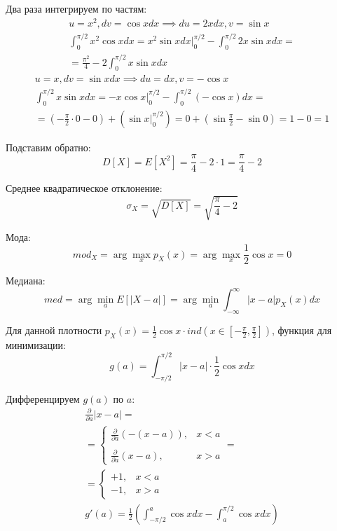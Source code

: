 \documentclass[a4paper,14pt]{extarticle}
\begin{document}
            Два раза интегрируем по частям:
            \begin{gather*}
                u = x^2, dv = \cos x dx \implies du = 2x dx, v = \sin x \\
                \int_{0}^{\pi/2} x^2 \cos x dx = x^2 \sin x dx |^{\pi/2}_{0} - \int_{0}^{\pi/2} 2x \sin x dx = \\
                = \frac{\pi^2}{4} - 2 \int_{0}^{\pi/2} x \sin x dx
            \end{gather*}
            \begin{gather*}
                u = x, dv = \sin x dx \implies du = dx, v = -\cos x \\
                \int_{0}^{\pi/2} x \sin x dx = -x \cos x |^{\pi/2}_0 - \int_{0}^{\pi/2} (-\cos x) dx = \\
                = (-\frac{\pi}{2} \cdot 0 - 0) + (\sin x |^{\pi/2}_0) = 0 + (\sin \frac{\pi}{2} - \sin 0) = 1 - 0 = 1
            \end{gather*}
            
            Подставим обратно:
            \[\boxed{D[X] = E[X^2] = \frac{\pi}{4} - 2 \cdot 1 = \frac{\pi}{4} - 2}\]
            
            Среднее квадратическое отклонение:
            \[\boxed{\sigma_X = \sqrt{D[X]} = \sqrt{\frac{\pi}{4} - 2}}\]
            
            Мода:
            \[\boxed{mod_X = \arg \max_x p_X(x) = \arg \max_x \frac{1}{2} \cos x = 0}\]
            
            Медиана:
            $$
            med = \arg\min_a E[|X - a|] = \arg\min_a \int_{-\infty}^{\infty} |x - a| p_X(x) dx
            $$
            
            Для данной плотности $p_X(x) = \frac{1}{2} \cos x \cdot ind\left(x \in \left[-\frac{\pi}{2}, \frac{\pi}{2}\right]\right)$, функция для минимизации:
            $$
            g(a) = \int_{-\pi/2}^{\pi/2} |x - a| \cdot \frac{1}{2} \cos x dx
            $$
            
            Дифференцируем $g(a)$ по $a$:
            \begin{gather*}
                \frac{\partial}{\partial a} |x - a| = \\
                = \begin{cases}
                      \frac{\partial}{\partial a} (-(x - a)), & x < a \\ \\
                      \frac{\partial}{\partial a} (x - a), & x > a
                \end{cases} = \\
                = \begin{cases}
                      +1, & x < a \\
                      -1, & x > a
                \end{cases} \\
                g'(a) = \frac{1}{2} \left( \int_{-\pi/2}^{a} \cos x dx - \int_{a}^{\pi/2} \cos x dx \right)
            \end{gather*}
            
\end{document}
